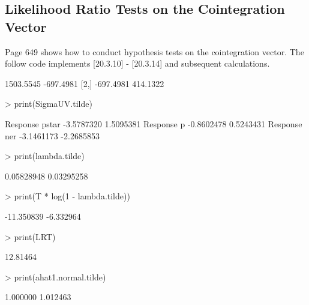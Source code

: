 \subsection{Likelihood Ratio Tests on the Cointegration Vector}
Page 649 shows how to conduct hypothesis tests on the cointegration vector.  The follow code implements
[20.3.10] - [20.3.14] and subsequent calculations.
\begin{Schunk}
\begin{Soutput}
          [,1]      [,2]
[1,] 1503.5545 -697.4981
[2,] -697.4981  414.1322
\end{Soutput}
\begin{Sinput}
> print(SigmaUV.tilde)
\end{Sinput}
\begin{Soutput}
                     [,1]       [,2]
Response pstar -3.5787320  1.5095381
Response p     -0.8602478  0.5243431
Response ner   -3.1461173 -2.2685853
\end{Soutput}
\begin{Sinput}
> print(lambda.tilde)
\end{Sinput}
\begin{Soutput}
[1] 0.05828948 0.03295258
\end{Soutput}
\begin{Sinput}
> print(T * log(1 - lambda.tilde))
\end{Sinput}
\begin{Soutput}
[1] -11.350839  -6.332964
\end{Soutput}
\begin{Sinput}
> print(LRT)
\end{Sinput}
\begin{Soutput}
[1] 12.81464
\end{Soutput}
\begin{Sinput}
> print(ahat1.normal.tilde)
\end{Sinput}
\begin{Soutput}
[1] 1.000000 1.012463
\end{Soutput}
\end{Schunk}
